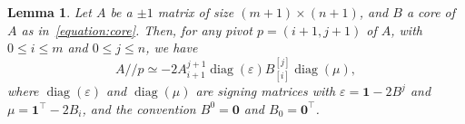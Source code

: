 \documentclass[11pt,a4paper]{amsart}
\renewcommand*{\leq}{\leqslant}
\theoremstyle{plain}
\newtheorem{lemma}[theorem]{Lemma}
\theoremstyle{definition}
\newcommand{\trim}{/\!\!/}
\DeclareMathOperator{\diag}{diag}
\begin{document}
\begin{lemma}\label{lemma:trimming_and_complement_orbit}
Let $A$ be a $\pm1$ matrix of size $(m+1)\times(n+1)$, and $B$ a core of $A$ as in~\eqref{equation:core}.
Then, for any pivot $p=(i+1,j+1)$ of $A$, with $0\leq i\leq m$ and $0\leq j \leq n$, we have
\begin{equation}\label{equation:trim_complement}
A\trim p \simeq -2A_{i+1}^{j+1}\diag(\varepsilon) B^{[j]}_{[i]}\diag(\mu),
\end{equation}
where $\diag(\varepsilon)$ and $\diag(\mu)$ are signing matrices with $\varepsilon = \mathbf{1} -2 B^j$ and $\mu=\mathbf{1}^\top -2 B_i$, and the convention $B^0=\mathbf{0}$ and $B_0=\mathbf{0}^\top$.
\end{lemma}
\end{document}
